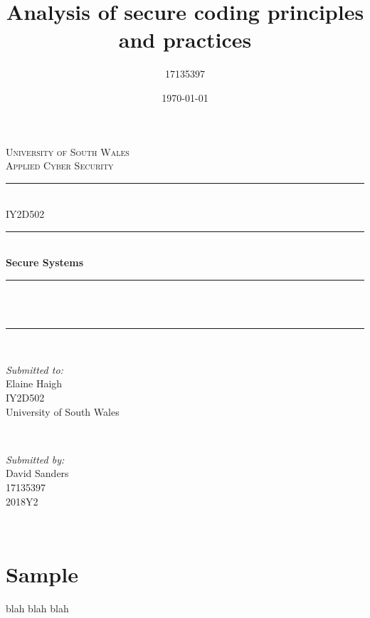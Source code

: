 \documentclass[12pt]{article}
\title{Analysis of secure coding principles and practices}
\author{17135397}
\date{\today}
\makeatletter
\let\thetitle\@title
\makeatother
\begin{document}
\begin{titlepage}
  \centering
  \textsc{\LARGE University of South Wales\\\Large Applied Cyber Security}\\[2cm]

  \rule{\linewidth}{0.2 mm} \\[0.5cm]
  { \huge IY2D502}\\
  \rule{\linewidth}{0.2 mm} \\[0.5cm]
  { \huge \bfseries Secure Systems}\\
  \rule{\linewidth}{0.2 mm} \\[0.5cm]
  \textsc{\Large \thetitle}\\
  \rule{\linewidth}{0.2 mm} \\[2cm]

  \begin{minipage}{0.4\textwidth}
    \begin{flushleft} \large
      \textit{Submitted to:}\\
      Elaine Haigh\\IY2D502\\University of South Wales
    \end{flushleft}
  \end{minipage}~
  \begin{minipage}{0.4\textwidth}
    \begin{flushright} \large
      \textit{Submitted by:}\\
      David Sanders\\17135397\\2018Y2
    \end{flushright}
  \end{minipage}\\[2 cm]
\end{titlepage}



\tableofcontents
\pagebreak



\section{Sample}
blah blah blah
\end{document}

